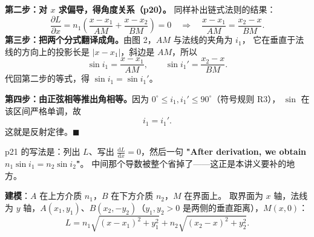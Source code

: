 \documentclass[11pt]{ctexart}
\begin{document}
\textbf{第二步：对 $x$ 求偏导，得角度关系（p20）。}
同样补出链式法则的结果：
\[
\frac{\partial L}{\partial x}
=n_1\left(\frac{x-x_1}{AM}+\frac{x-x_2}{BM}\right)=0
\quad\Longrightarrow\quad
\frac{x-x_1}{AM}=\frac{x_2-x}{BM}.
\]
\textbf{第三步：把两个分式翻译成角。}由图 2，$AM$ 与法线的夹角为 $i_1$，
它在垂直于法线的方向上的投影长是 $|x-x_1|$，斜边是 $AM$，所以
\[
\sin i_1=\frac{x-x_1}{AM},\qquad \sin i_1'=\frac{x_2-x}{BM}.
\]
代回第二步的等式，得 $\sin i_1=\sin i_1'$。

\textbf{第四步：由正弦相等推出角相等。}因为 $0^\circ\le i_1,i_1'\le90^\circ$（符号规则 R3），
$\sin$ 在该区间严格单调，故
\[
i_1=i_1' .
\]
这就是反射定律。$\blacksquare$



p21 的写法是：列出 $L$、写出 $\frac{\mathrm{d}L}{\mathrm{d}x}=0$，然后一句
\textbf{"After derivation, we obtain $n_1\sin i_1=n_2\sin i_2$"}。
中间那个导数被整个省掉了——这正是本讲义要补的地方。

\textbf{建模}：$A$ 在上方介质 $n_1$，$B$ 在下方介质 $n_2$，$M$ 在界面上。
取界面为 $x$ 轴，法线为 $y$ 轴，$A(x_1,y_1)$、$B(x_2,-y_2)$（$y_1,y_2>0$ 是两侧的垂直距离），$M(x,0)$：
\[
L=n_1\sqrt{(x-x_1)^2+y_1^2}+n_2\sqrt{(x_2-x)^2+y_2^2}.
\]
\end{document}
